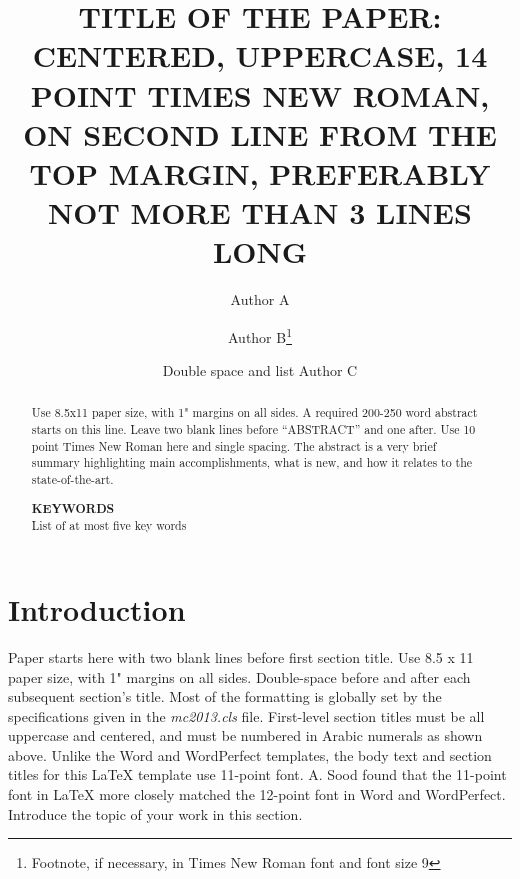 \documentclass{ansconf}
\begin{document}
\title{TITLE OF THE PAPER: CENTERED, UPPERCASE, 14 POINT TIMES NEW ROMAN, ON
  SECOND LINE FROM THE TOP MARGIN, PREFERABLY NOT MORE THAN 3 LINES LONG}

\author{Author A}
\author{Author B\footnote{Footnote, if necessary, in Times
  New Roman font and font size 9}}

\author{Double space and list Author C}

\maketitle

\begin{abstract}
Use 8.5x11 paper size, with 1" margins on all sides.  A required 200-250 word
abstract starts on this line.  Leave two blank lines before ``ABSTRACT'' and one
after.  Use 10 point Times New Roman here and single spacing. The abstract is a
very brief summary highlighting main accomplishments, what is new, and how it
relates to the state-of-the-art.

\raggedleft
\textbf{KEYWORDS}\\
List of at most five key words
\end{abstract}


\raggedright

\section{Introduction}

Paper starts here with two blank lines before first section title.  Use
8.5 x 11 paper size, with 1" margins on all sides.  Double-space before and
after each subsequent section's title.  Most of the formatting is globally
set by the specifications given in the {\it mc2013.cls} file.
First-level section titles must be all uppercase and centered, and must
be numbered in Arabic numerals as shown above.  Unlike the Word and WordPerfect
templates, the body text and section titles for this {\LaTeX} template use
11-point font.  A. Sood found that the 11-point font in {\LaTeX} more closely
matched the 12-point font in Word and WordPerfect.  Introduce the topic of
your work in this section.
\end{document}

